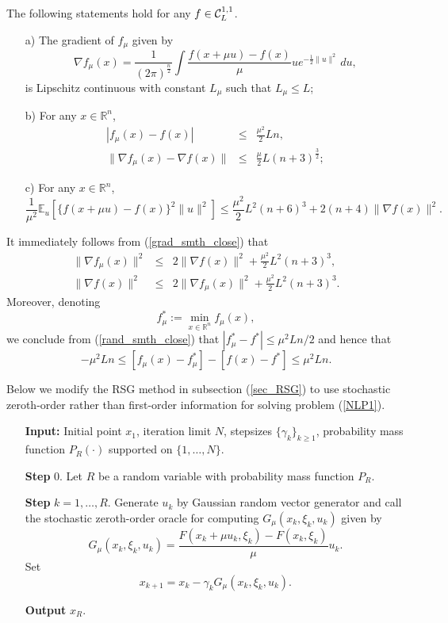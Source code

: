 \documentclass[final]{siamltex}
\newcommand{\beq}{\begin{equation}}
\newcommand{\eeq}{\end{equation}}
\newcommand{\beqa}{\begin{eqnarray}}
\newcommand{\eeqa}{\end{eqnarray}}
\def\eqnok#1{(\ref{#1})}
\def\vgap{\vspace*{.1in}}
\newcommand{\bbe}{\mathbb{E}}
\newcommand{\bbr}{\mathbb{R}}
\begin{document}
\begin{theorem} \label{smth_approx}
The following statements hold for any $f \in {\cal C}^{1,1}_L$.
\begin{itemize}
\item [a)] The gradient of $f_{\mu}$ given by
\beq \label{smth_approx_grad}
\nabla f_{\mu}(x) = \frac{1}{(2 \pi)^{\frac{n}{2}}} \int \frac{f(x+\mu u)-f(x)}{\mu} u e^{-\frac{1}{2}\|u\|^2} \,du,
\eeq
is Lipschitz continuous with constant $L_{\mu}$ such that $L_{\mu} \le L$;
\item [b)] For any $x \in \bbr^n$,
\beqa
|f_{\mu}(x)-f(x)| &\le& \frac{\mu^2}{2} L n, \label{rand_smth_close}\\
\|\nabla f_{\mu}(x) - \nabla f(x)\| &\le& \frac{\mu}{2}L (n+3)^{\frac{3}{2}}; \label{grad_smth_close}
\eeqa
\item [c)]
For any $x \in \bbr^n$,
\beq \label{stoch_smth_approx_grad}
\frac{1}{\mu^2}\bbe_u[\{f(x+\mu u)-f(x)\}^2\|u\|^2] \le \frac{ \mu^2}{2}L^2(n+6)^3 + 2(n+4)\|\nabla f(x)\|^2.
\eeq
\end{itemize}

\end{theorem}

It immediately follows from \eqnok{grad_smth_close} that
\beqa
\|\nabla f_{\mu}(x)\|^2 &\le& 2 \|\nabla f(x)\|^2+ \frac{ \mu^2}{2} L^2 (n+3)^3, \label{grad_smth_close2}\\
\|\nabla f(x)\|^2 &\le& 2\|\nabla f_{\mu}(x)\|^2+ \frac{\mu^2}{2} L^2 (n+3)^3.
\eeqa
Moreover, denoting
\beq \label{def_f_mu_s}
f_\mu^* := \min_{x \in \bbr^n} f_\mu(x),
\eeq
we conclude from \eqnok{rand_smth_close} that $|f_\mu^* - f^*| \le \mu^2 L n / 2$ and hence
that
\beq \label{closef}
 - \mu^2 L n \le [f_\mu(x) - f_\mu^*] - [f(x) - f^*] \le \mu^2 L n.
\eeq
\vgap

Below we modify the RSG method in subsection \eqnok{sec_RSG}
to use stochastic zeroth-order rather than first-order information for solving problem \eqnok{NLP1}.

\vgap

\begin{itemize}
\item [] {\bf Input:} Initial point $x_1$,
iteration limit $N$, stepsizes $\{\gamma_k\}_{k \ge 1}$, probability mass function $P_{R}(\cdot)$
supported on $\{1, \ldots, N\}$.
\item[] {\bf Step} $0$. Let $R$ be a random variable with probability mass function $P_{R}$.
\item [] {\bf Step} $k = 1, \ldots, R$. Generate $u_k$ by Gaussian random vector generator and
call the stochastic zeroth-order oracle for computing $G_{\mu}(x_k, \xi_k, u_k)$ given by
\beq \label{grad_free_def}
G_{\mu}(x_k, \xi_k, u_k)=\frac{F(x_k+\mu u_k, \xi_k)-F(x_k,\xi_k)}{\mu}u_k.
\eeq
Set
\beq \label{update_SGF}
x_{k+1} = x_k - \gamma_k G_{\mu}(x_k, \xi_k, u_k).
\eeq
\item[]  {\bf Output} $x_R$.
\end{itemize}
\end{document}

